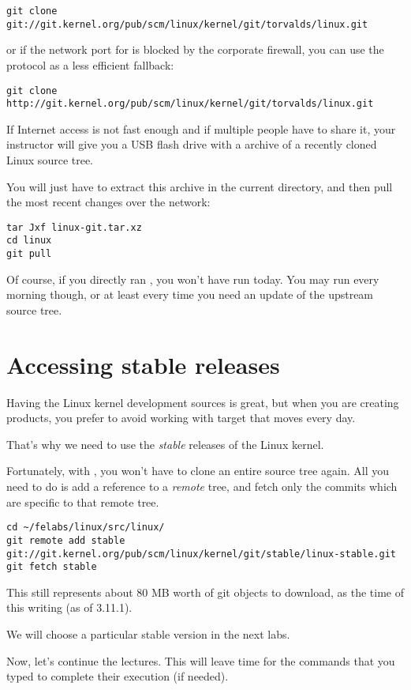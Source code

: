 {\small
\begin{verbatim}
git clone git://git.kernel.org/pub/scm/linux/kernel/git/torvalds/linux.git
\end{verbatim}
}

or if the network port for  is blocked by the corporate
firewall, you can use the  protocol as a less efficient
fallback:

{\small
\begin{verbatim}
git clone http://git.kernel.org/pub/scm/linux/kernel/git/torvalds/linux.git 
\end{verbatim}
}

If Internet access is not fast enough and if multiple people have to
share it, your instructor will give you a USB flash drive with a
 archive of a recently cloned Linux source tree.

You will just have to extract this archive in the current directory,
and then pull the most recent changes over the network:

\begin{verbatim}
tar Jxf linux-git.tar.xz
cd linux
git pull
\end{verbatim}

Of course, if you directly ran , you won't have run 
 today. You may run  every morning though,
or at least every time you need an update of the upstream source tree.

\section{Accessing stable releases}

Having the Linux kernel development sources is great, but when you are 
creating products, you prefer to avoid working with target that moves
every day.

That's why we need to use the {\em stable} releases of the Linux
kernel.

Fortunately, with , you won't have to clone an entire source
tree again. All you need to do is add a reference to a {\em remote}
tree, and fetch only the commits which are specific to that remote tree.

{\footnotesize
\begin{verbatim}
cd ~/felabs/linux/src/linux/
git remote add stable git://git.kernel.org/pub/scm/linux/kernel/git/stable/linux-stable.git
git fetch stable
\end{verbatim}
}

This still represents about 80 MB worth of git objects to download, as
the time of this writing (as of 3.11.1).

We will choose a particular stable version in the next labs.

Now, let's continue the lectures. This will leave time for the commands
that you typed to complete their execution (if needed).
